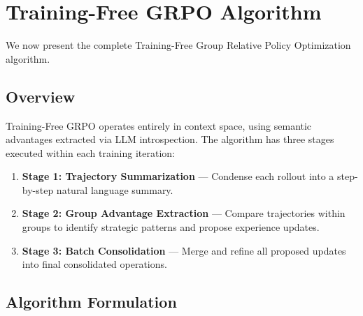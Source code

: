 \section{Training-Free GRPO Algorithm}

\label{sec:algorithm}

We now present the complete Training-Free Group Relative Policy Optimization algorithm.

\subsection{Overview}

Training-Free GRPO operates entirely in context space, using semantic advantages extracted via LLM introspection. The algorithm has three stages executed within each training iteration:

\begin{enumerate}
    \item \textbf{Stage 1: Trajectory Summarization} — Condense each rollout into a step-by-step natural language summary.
    \item \textbf{Stage 2: Group Advantage Extraction} — Compare trajectories within groups to identify strategic patterns and propose experience updates.
    \item \textbf{Stage 3: Batch Consolidation} — Merge and refine all proposed updates into final consolidated operations.
\end{enumerate}

\subsection{Algorithm Formulation}

